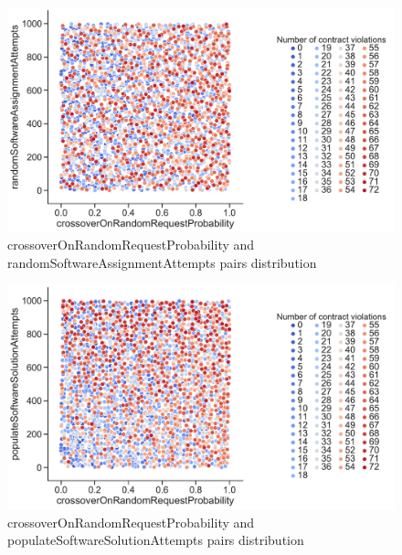 \begin{figure}
	\centering
	\includegraphics[width=\textwidth]{images/PairsDistr/crossoverOnRandomRequestProbability_randomSoftwareAssignmentAttempts.pdf}
	\caption[crossoverOnRandomRequestProbability and randomSoftwareAssignmentAttempts pairs distribution]{crossoverOnRandomRequestProbability and randomSoftwareAssignmentAttempts pairs distribution}
	\label{fig:crossoverOnRandomRequestProbability_randomSoftwareAssignmentAttempts_pair}
\end{figure}
\clearpage
\begin{figure}
	\centering
	\includegraphics[width=\textwidth]{images/PairsDistr/crossoverOnRandomRequestProbability_populateSoftwareSolutionAttempts.pdf}
	\caption[crossoverOnRandomRequestProbability and populateSoftwareSolutionAttempts pairs distribution]{crossoverOnRandomRequestProbability and populateSoftwareSolutionAttempts pairs distribution}
	\label{fig:crossoverOnRandomRequestProbability_populateSoftwareSolutionAttempts_pair}
\end{figure}
\clearpage
